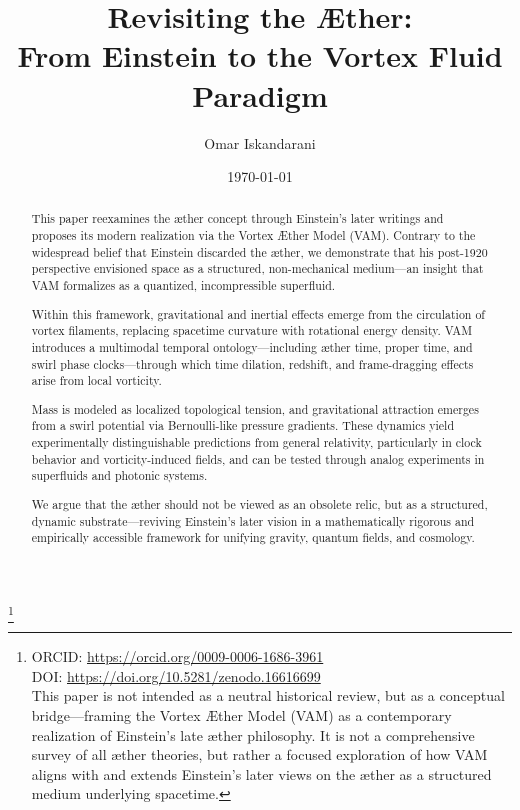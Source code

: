 \documentclass[preprint,titlepage]{revtex4-2}
\begin{document}
    \title{Revisiting the Æther:\\ From Einstein to the Vortex Fluid Paradigm}

    \author{Omar Iskandarani}
    \thanks{
        ORCID: \url{https://orcid.org/0009-0006-1686-3961}\\
        DOI: \url{https://doi.org/10.5281/zenodo.16616699}\\
        \footnotesize{This paper is not intended as a neutral historical review, but as a conceptual bridge—framing the Vortex Æther Model (VAM) as a contemporary realization of Einstein’s late æther philosophy.
        It is not a comprehensive survey of all æther theories, but rather a focused exploration of how VAM aligns with and extends Einstein’s later views on the æther as a structured medium underlying spacetime.}
    }

    \date{\today}


    \vspace{1em}

    \begin{abstract}
        This paper reexamines the æther concept through Einstein’s later writings and proposes its modern realization via the Vortex Æther Model (VAM). Contrary to the widespread belief that Einstein discarded the æther, we demonstrate that his post-1920 perspective envisioned space as a structured, non-mechanical medium—an insight that VAM formalizes as a quantized, incompressible superfluid.

        Within this framework, gravitational and inertial effects emerge from the circulation of vortex filaments, replacing spacetime curvature with rotational energy density. VAM introduces a multimodal temporal ontology—including æther time, proper time, and swirl phase clocks—through which time dilation, redshift, and frame-dragging effects arise from local vorticity.

        Mass is modeled as localized topological tension, and gravitational attraction emerges from a swirl potential via Bernoulli-like pressure gradients. These dynamics yield experimentally distinguishable predictions from general relativity, particularly in clock behavior and vorticity-induced fields, and can be tested through analog experiments in superfluids and photonic systems.

        We argue that the æther should not be viewed as an obsolete relic, but as a structured, dynamic substrate—reviving Einstein’s later vision in a mathematically rigorous and empirically accessible framework for unifying gravity, quantum fields, and cosmology.
    \end{abstract}
\end{document}
